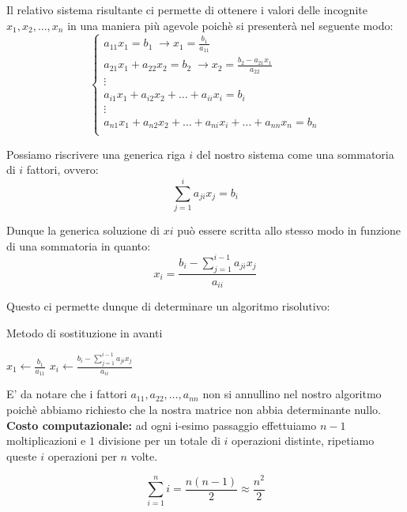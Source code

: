 \documentclass[12pt, a4paper]{book}
\theoremstyle{definition}
\begin{document}
\begin{flushleft}
\begin{enumerate}
	Il relativo sistema risultante ci permette di ottenere i valori delle incognite $x_{1},x_{2}, \dots, x_{n}$ in una maniera più agevole  poichè si presenterà nel seguente modo: 	
	\[ 
		\begin{cases}
  				a_{11}x_{1} = b_{1} \; \longrightarrow x_{1} = \frac{b_{1}}{a_{11}} \\   
       			a_{21}x_{1} + a_{22}x_{2} = b_{2} \; \longrightarrow x_{2} = \frac{b_{2}- a_{21}x_{1}}{a_{22}}  \\
       			\vdots \\
       			a_{i1}x_{1} + a_{i2}x_{2}  + \dots + a_{ii}x_{i} = b_{i} \\
       			\vdots \\
  				a_{n1}x_{1} + a_{n2}x_{2}  + \dots + a_{ni}x_{i} + \dots + a_{nn}x_{n} = b_{n} \\
		\end{cases}	
	\]
	
	Possiamo riscrivere una generica riga $i$ del nostro sistema come una sommatoria di $i$ fattori, ovvero: 
	\[
		\sum_{j = 1} ^ {i} a_{ji}x_{j} = b_{i}
	\]	
	
	Dunque la generica soluzione di $xi$ può essere scritta allo stesso modo in funzione di una sommatoria in quanto:
	\[
		x_{i} = \frac{ b_{i} - \sum_{j = 1} ^ {i-1} a_{ji}x_{j}}{a_{ii}}
	\]	
	
	Questo ci permette dunque di determinare un algoritmo risolutivo: 
	
	\begin{algorithm}
		\caption{ Metodo di sostituzione in avanti}
		\begin{algorithmic} 
			\STATE $ x_{1} \leftarrow  \frac{b_{1}}{a_{11}}$
				\STATE $ x_{i} \leftarrow  \frac{ b_{i} - \sum_{j = 1} ^ {i-1} a_{ji}x_{j}}{a_{ii}} $
			\ENDFOR
		\end{algorithmic}
	\end{algorithm}	
	
	E' da notare che i fattori $a_{11}, a_{22}, \dots, a_{nn}$ non si annullino nel nostro algoritmo poichè abbiamo richiesto che la nostra matrice non abbia determinante nullo.\\
\vspace{1em}
\textbf{Costo computazionale:} ad ogni i-esimo passaggio effettuiamo $n-1$ moltiplicazioni e $1$ divisione per un totale di $i$ operazioni distinte,  ripetiamo queste $i$ operazioni per $n$ volte. 

\[
	\sum_{i = 1}^{n} i = \frac{n(n-1)}{2} \approx \frac{n^{2}}{2}
\]


\end{enumerate}
\end{flushleft}
\end{document}
